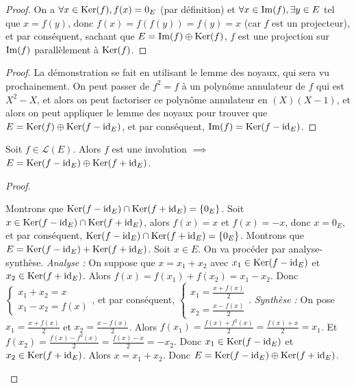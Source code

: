 \documentclass[12pt,a4paper]{report}
\begin{document}
\begin{proof}
    On a $\forall x \in \mathrm{Ker}(f), f(x) = 0_E$ (par définition) et $\forall x \in \mathrm{Im}(f), \exists y \in E$ tel que $x = f(y)$, donc $f(x) = f(f(y)) = f(y) = x$ (car $f$ est un projecteur), et par conséquent, sachant que $E = \mathrm{Im}(f) \oplus \mathrm{Ker}(f)$, $f$ est une projection sur $\mathrm{Im}(f)$ parallèlement à $\mathrm{Ker}(f)$.
\end{proof}

\begin{proof}
    La démonstration se fait en utilisant le lemme des noyaux, qui sera vu prochainement. On peut passer de $f^2 = f$ à un polynôme annulateur de $f$ qui est $X^2 - X$, et alors on peut factoriser ce polynôme annulateur en $(X)(X-1)$, et alors on peut appliquer le lemme des noyaux pour trouver que $E = \mathrm{Ker}(f) \oplus \mathrm{Ker}(f - \mathrm{id}_E)$, et par conséquent, $\mathrm{Im}(f) = \mathrm{Ker}(f - \mathrm{id}_E)$.
\end{proof}

\begin{property}
    Soit $f \in \mathcal L(E)$. Alors $f$ est une involution $\implies$ $E = \mathrm{Ker}(f - \mathrm{id}_E) \oplus \mathrm{Ker}(f + \mathrm{id}_E)$.
\end{property}

\begin{proof}
    \begin{outline}
        \1 Montrons que $\mathrm{Ker}(f - \mathrm{id}_E) \cap \mathrm{Ker}(f + \mathrm{id}_E) = \{0_E\}$.
        \2 Soit $x \in \mathrm{Ker}(f - \mathrm{id}_E) \cap \mathrm{Ker}(f + \mathrm{id}_E)$, alors $f(x) = x$ et $f(x) = -x$, donc $x = 0_E$, et par conséquent, $\mathrm{Ker}(f - \mathrm{id}_E) \cap \mathrm{Ker}(f + \mathrm{id}_E) = \{0_E\}$.
        \1 Montrons que $E = \mathrm{Ker}(f - \mathrm{id}_E) + \mathrm{Ker}(f + \mathrm{id}_E)$.
        \2 Soit $x \in E$. On va procéder par analyse-synthèse.
        \2 \textit{Analyse :}
        \3 On suppose que $x = x_1 + x_2$ avec $x_1 \in \mathrm{Ker}(f - \mathrm{id}_E)$ et $x_2 \in \mathrm{Ker}(f + \mathrm{id}_E)$.
        \3 Alors $f(x) = f(x_1) + f(x_2) = x_1 - x_2$.
        \3 Donc $\begin{cases}x_1 + x_2 = x\\ x_1 - x_2 = f(x)\end{cases}$, et par conséquent, $\begin{cases}x_1 = \frac{x + f(x)}{2}\\ x_2 = \frac{x - f(x)}{2}\end{cases}$.
        \2 \textit{Synthèse :}
        \3 On pose $x_1 = \frac{x + f(x)}{2}$ et $x_2 = \frac{x - f(x)}{2}$.
        \3 Alors $f(x_1) = \frac{f(x) + f^2(x)}{2} = \frac{f(x) + x}{2} = x_1$.
        \3 Et $f(x_2) = \frac{f(x) - f^2(x)}{2} = \frac{f(x) - x}{2} = -x_2$.
        \3 Donc $x_1 \in \mathrm{Ker}(f - \mathrm{id}_E)$ et $x_2 \in \mathrm{Ker}(f + \mathrm{id}_E)$.
        \3 Alors $x = x_1 + x_2$.
        \1 Donc $E = \mathrm{Ker}(f - \mathrm{id}_E) \oplus \mathrm{Ker}(f + \mathrm{id}_E)$.
    \end{outline}
\end{proof}
\end{document}
